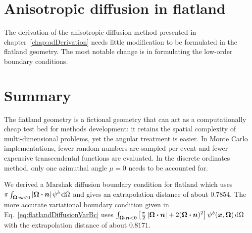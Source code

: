 \section{Anisotropic diffusion in flatland}
The derivation of the anisotropic diffusion method presented in
chapter~\ref{chap:adDerivation} needs little modification to be formulated
in the flatland geometry. The most notable change is in formulating the
low-order boundary conditions.

\section{Summary}
The flatland geometry is a fictional geometry that can act as a computationally
cheap test bed for methods development: it retains the spatial complexity of
multi-dimensional problems, yet the angular treatment is easier. In Monte Carlo
implementations, fewer random numbers are sampled per event and fewer expensive
transcendental functions are evaluated. In the discrete ordinates method, only
one azimuthal angle $\mu=0$ needs to be accounted for.

We derived a Marshak diffusion boundary condition for flatland which uses $\pi
\int_{\bm{\Omega}\bm{\cdot} \bm{n} < 0 } \left| \bm{\Omega}\bm{\cdot} \bm{n} \right| \psi^b
\mathop{}\!\mathrm{d}\Omega$ and gives an extrapolation distance of about $0.7854$.
The more accurate variational boundary condition given in
Eq.~\eqref{eq:flatlandDiffusionVarBc} uses $\int_{\bm{\Omega}\bm{\cdot}\bm{n} < 0}
\left[ \frac{\pi}{2} \left| \bm{\Omega}\bm{\cdot}\bm{n} \right| + 2 (\bm{\Omega}\bm{\cdot}\bm{n})^2
\right] \psi^b(\bm{x}, \bm{\Omega}) \mathop{}\!\mathrm{d}\Omega$ with the extrapolation
distance of about $0.8171$.

